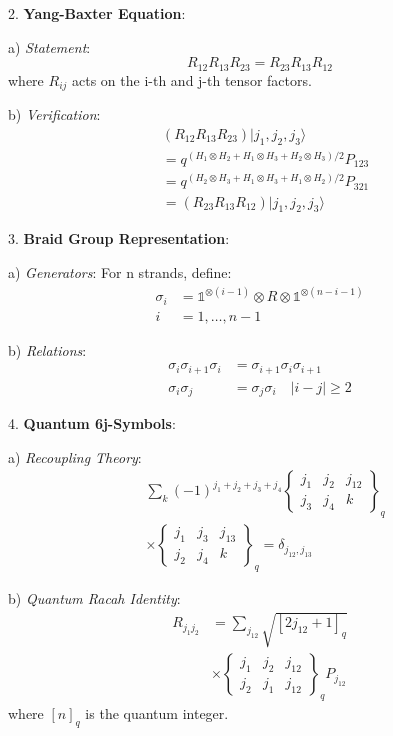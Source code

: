 \documentclass[12pt,a4paper]{article}
\begin{document}
2. \textbf{Yang-Baxter Equation}:
   
   a) \textit{Statement}:
      \[
      R_{12}R_{13}R_{23} = R_{23}R_{13}R_{12}
      \]
      where $R_{ij}$ acts on the i-th and j-th tensor factors.
   
   b) \textit{Verification}:
      \[
      \begin{aligned}
      &(R_{12}R_{13}R_{23})|j_1,j_2,j_3\rangle \\
      &= q^{(H_1 \otimes H_2 + H_1 \otimes H_3 + H_2 \otimes H_3)/2}P_{123} \\
      &= q^{(H_2 \otimes H_3 + H_1 \otimes H_3 + H_1 \otimes H_2)/2}P_{321} \\
      &= (R_{23}R_{13}R_{12})|j_1,j_2,j_3\rangle
      \end{aligned}
      \]

3. \textbf{Braid Group Representation}:
   
   a) \textit{Generators}:
      For n strands, define:
      \[
      \begin{aligned}
      \sigma_i &= \mathbb{1}^{\otimes(i-1)} \otimes R \otimes \mathbb{1}^{\otimes(n-i-1)} \\
      i &= 1,\ldots,n-1
      \end{aligned}
      \]
   
   b) \textit{Relations}:
      \[
      \begin{aligned}
      \sigma_i\sigma_{i+1}\sigma_i &= \sigma_{i+1}\sigma_i\sigma_{i+1} \\
      \sigma_i\sigma_j &= \sigma_j\sigma_i \quad |i-j| \geq 2
      \end{aligned}
      \]

4. \textbf{Quantum 6j-Symbols}:
   
   a) \textit{Recoupling Theory}:
      \[
      \begin{aligned}
      &\sum_{k} (-1)^{j_1+j_2+j_3+j_4} \begin{Bmatrix} j_1 & j_2 & j_{12} \\ j_3 & j_4 & k \end{Bmatrix}_q \\
      &\times \begin{Bmatrix} j_1 & j_3 & j_{13} \\ j_2 & j_4 & k \end{Bmatrix}_q = \delta_{j_{12},j_{13}}
      \end{aligned}
      \]
   
   b) \textit{Quantum Racah Identity}:
      \[
      \begin{aligned}
      R_{j_1j_2} &= \sum_{j_{12}} \sqrt{[2j_{12}+1]_q} \\
      &\times \begin{Bmatrix} j_1 & j_2 & j_{12} \\ j_2 & j_1 & j_{12} \end{Bmatrix}_q P_{j_{12}}
      \end{aligned}
      \]
      where $[n]_q$ is the quantum integer.
\end{document}
